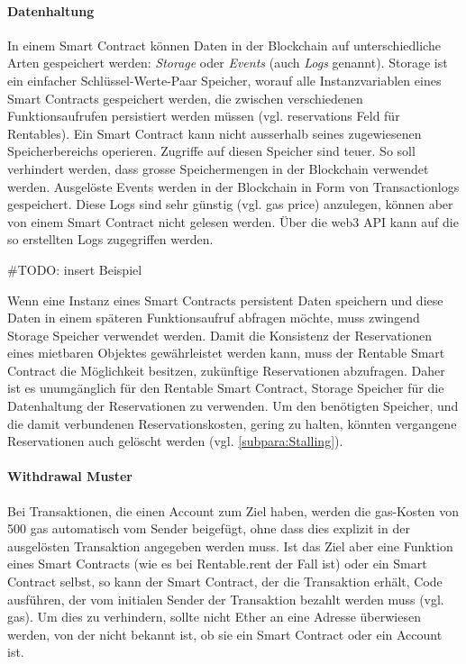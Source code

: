 \paragraph{Datenhaltung}
In einem Smart Contract können Daten in der Blockchain auf unterschiedliche Arten gespeichert werden: \emph{Storage} oder \emph{Events} (auch \emph{Logs} genannt). Storage ist ein einfacher Schlüssel-Werte-Paar Speicher, worauf alle Instanzvariablen eines Smart Contracts gespeichert werden, die zwischen verschiedenen Funktionsaufrufen persistiert werden müssen (vgl. reservations Feld für Rentables). Ein Smart Contract kann nicht ausserhalb seines zugewiesenen Speicherbereichs operieren. Zugriffe auf diesen Speicher sind teuer. So soll verhindert werden, dass grosse Speichermengen in der Blockchain verwendet werden. Ausgelöste Events werden in der Blockchain in Form von Transactionlogs gespeichert. Diese Logs sind sehr günstig (vgl. gas price) anzulegen, können aber von einem Smart Contract nicht gelesen werden. Über die web3 API kann auf die so erstellten Logs zugegriffen werden.\cite[Miscellaneous/Introduction to Smart Contracts]{solidity.readthedocs.io}\cite{jonathanpatrick.me/ethereum}

\#TODO: insert Beispiel

Wenn eine Instanz eines Smart Contracts persistent Daten speichern und diese Daten in einem späteren Funktionsaufruf abfragen möchte, muss zwingend Storage Speicher verwendet werden. Damit die Konsistenz der Reservationen eines mietbaren Objektes gewährleistet werden kann, muss der Rentable Smart Contract die Möglichkeit besitzen, zukünftige Reservationen abzufragen. Daher ist es unumgänglich für den Rentable Smart Contract, Storage Speicher für die Datenhaltung der Reservationen zu verwenden. Um den benötigten Speicher, und die damit verbundenen Reservationskosten, gering zu halten, könnten vergangene Reservationen auch gelöscht werden (vgl. \ref{subpara:Stalling}).

\paragraph{Withdrawal Muster}
\label{para:Withdrawal_Muster}
Bei Transaktionen, die einen Account zum Ziel haben, werden die gas-Kosten von 500 gas automatisch vom Sender beigefügt, ohne dass dies explizit in der ausgelösten Transaktion angegeben werden muss. Ist das Ziel aber eine Funktion eines Smart Contracts (wie es bei Rentable.rent der Fall ist) oder ein Smart Contract selbst, so kann der Smart Contract, der die Transaktion erhält, Code ausführen, der vom initialen Sender der Transaktion bezahlt werden muss (vgl. gas). Um dies zu verhindern, sollte nicht Ether an eine Adresse überwiesen werden, von der nicht bekannt ist, ob sie ein Smart Contract oder ein Account ist.\cite[Wiki/Contracts and Transactions]{go-ethereum}\cite{cryptocompare.com/gas}\cite[FAQ/What is the deal with...]{solidity.readthedocs.io}

